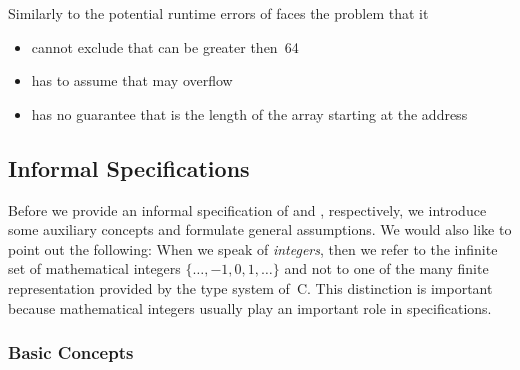 Similarly to the potential runtime errors of \peek \framacwp
faces the problem that it

\begin{itemize}
\item cannot exclude that  can be greater then~64 
\item has to assume that  may overflow
\item has no guarantee that  is the length 
      of the array starting at the address 
\end{itemize}

\clearpage

\subsection{Informal Specifications}
\label{sec:informal-specification}

Before we provide an informal specification of \peek and \poke, respectively,
we introduce some auxiliary concepts and formulate general assumptions.
We would also like to point out the following: 
When we speak of \emph{integers}, then we refer to the infinite set of mathematical
integers $\{\ldots, -1, 0, 1, \ldots\}$
and not to one of the many finite representation provided by the type system of~C.
This distinction is important because mathematical integers
usually play an important role in \acsl specifications.

\subsubsection{Basic Concepts}

